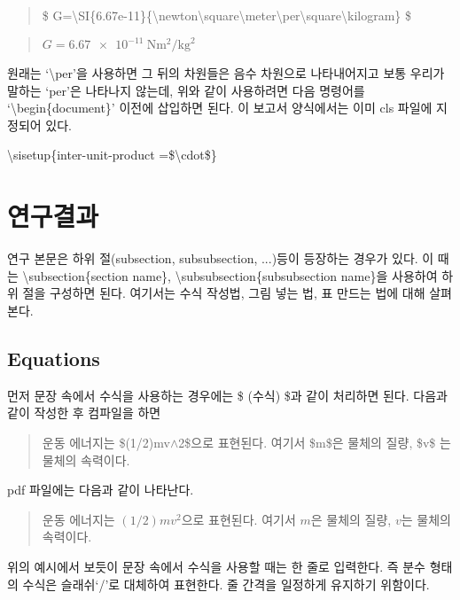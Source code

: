 \documentclass{gshs-report-v1.2}
\begin{document}
\begin{center}
	\begin{quote}
		\$ G=\textbackslash SI\{6.67e-11\}\{\textbackslash newton\textbackslash square\textbackslash meter\textbackslash per\textbackslash square\textbackslash kilogram\} \$
	\end{quote}
	
	\begin{quote}
		$ G=\SI{6.67e-11}{\newton\square\meter\per\square\kilogram} $
	\end{quote}
\end{center}

원래는 `\textbackslash per'을 사용하면 그 뒤의 차원들은 음수 차원으로 나타내어지고 보통 우리가 말하는 `per'은 나타나지 않는데,
위와 같이 사용하려면 다음 명령어를 `\textbackslash begin\{document\}' 이전에 삽입하면 된다.
이 보고서 양식에서는 이미 cls 파일에 지정되어 있다. 
\begin{center}
	\textbackslash sisetup\{inter-unit-product =\$\textbackslash cdot\$\}
\end{center}



\section{연구결과}
연구 본문은 하위 절(subsection, subsubsection, ...)등이 등장하는 경우가 있다. 이 때는 {\textbackslash}subsection\{section name\}, {\textbackslash}subsubsection\{subsubsection name\}을 사용하여 하위 절을 구성하면 된다. 여기서는 수식 작성법, 그림 넣는 법, 표 만드는 법에 대해 살펴본다.

\subsection{Equations}

먼저 문장 속에서 수식을 사용하는 경우에는 \$ (수식) \$과 같이 처리하면 된다. 다음과 같이 작성한 후 컴파일을 하면
\begin{quote}
	운동 에너지는 \$(1/2)mv$\wedge$2\$으로 표현된다. 여기서 \$m\$은 물체의 질량, \$v\$ 는 물체의 속력이다.
\end{quote}
pdf 파일에는 다음과 같이 나타난다.
\begin{quote}
	운동 에너지는 $(1/2)mv^2$으로 표현된다. 여기서 $m$은 물체의 질량, $v$는 물체의 속력이다.
\end{quote}
위의 예시에서 보듯이 문장 속에서 수식을 사용할 때는 한 줄로 입력한다. 즉 분수 형태의 수식은 슬래쉬`/'로 대체하여 표현한다. 줄 간격을 일정하게 유지하기 위함이다.
\end{document}
